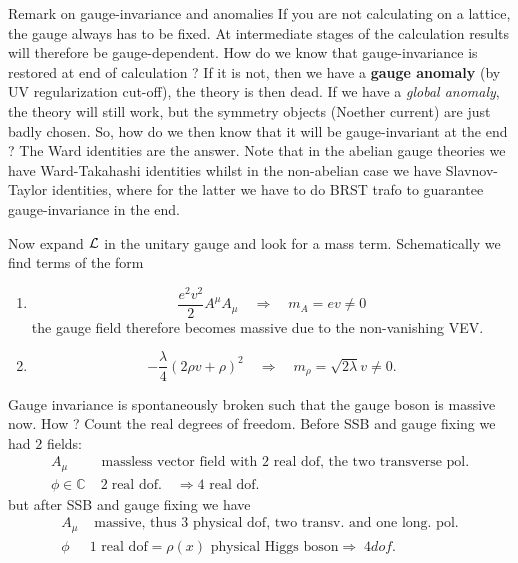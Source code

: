 \begin{mybox}{Remark on gauge-invariance and anomalies}
	If you are not calculating on a lattice, the gauge always has to be fixed. At intermediate stages of the calculation results will therefore be gauge-dependent. How do we know that gauge-invariance is restored at end of calculation ? If it is not, then we have a \textbf{gauge anomaly} (by UV regularization cut-off), the theory is then dead. If we have a \emph{global anomaly}, the theory will still work, but the symmetry objects (Noether current) are just badly chosen. So, how do we then know that it will be gauge-invariant at the end ? The Ward identities are the answer. Note that in the abelian gauge theories we have Ward-Takahashi identities whilst in the non-abelian case we have Slavnov-Taylor identities, where for the latter we have to do BRST trafo to guarantee gauge-invariance in the end.
\end{mybox}
Now expand $\mathcal{L}$ in the unitary gauge and look for a mass term. Schematically we find terms of the form
\begin{enumerate}
	\item \begin{equation}
	\frac{e^2 v^2}{2} A^\mu A_\mu \quad \Rightarrow \quad m_A =ev\neq 0
	\end{equation}
	the gauge field therefore becomes massive due to the non-vanishing VEV.
	\item \begin{equation}
	-\frac{\lambda}{4} (2 \rho v + \rho)^2 \quad \Rightarrow \quad  m_\rho = \sqrt{2 \lambda} v \neq 0.
	\end{equation}
\end{enumerate}
Gauge invariance is spontaneously broken such that the gauge boson is massive now. How ? Count the real degrees of freedom.
Before SSB and gauge fixing we had $2$ fields:
\begin{align*}
	A_\mu& \text{ massless vector field with }2 \text{ real dof, the two transverse pol.}\\
	\phi \in \mathbb{C}& \; 2\; \text{real dof.} \quad \Rightarrow 4 \text{ real dof.}
\end{align*}
but after SSB and gauge fixing we have
\begin{align*}
	A_\mu& \text{ massive, thus }3\text{ physical dof, two transv. and one long. pol.}\\
	\phi& 1 \text{ real dof}=\rho(x) \text{ physical Higgs boson} \Rightarrow\; 4 dof.
\end{align*}
